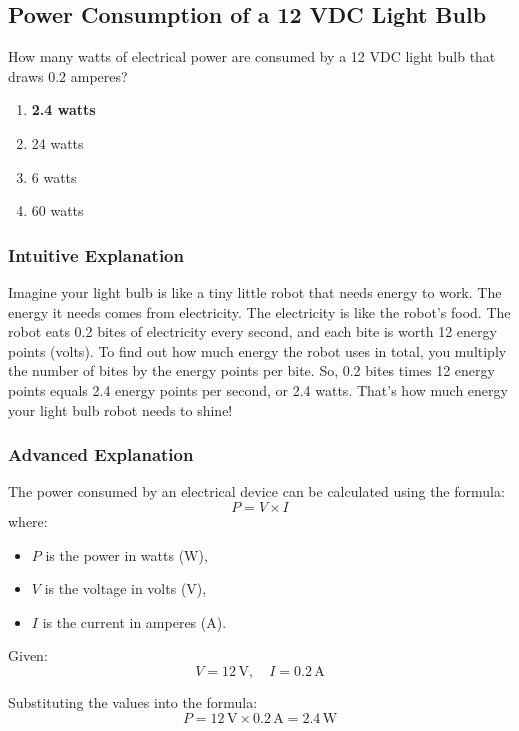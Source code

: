 \subsection{Power Consumption of a 12 VDC Light Bulb}
\label{G5B04}

\begin{tcolorbox}[colback=gray!10!white,colframe=black!75!black,title=G5B04]
How many watts of electrical power are consumed by a 12 VDC light bulb that draws 0.2 amperes?
\begin{enumerate}[label=\Alph*,noitemsep]
    \item \textbf{2.4 watts}
    \item 24 watts
    \item 6 watts
    \item 60 watts
\end{enumerate}
\end{tcolorbox}

\subsubsection{Intuitive Explanation}
Imagine your light bulb is like a tiny little robot that needs energy to work. The energy it needs comes from electricity. The electricity is like the robot's food. The robot eats 0.2 bites of electricity every second, and each bite is worth 12 energy points (volts). To find out how much energy the robot uses in total, you multiply the number of bites by the energy points per bite. So, 0.2 bites times 12 energy points equals 2.4 energy points per second, or 2.4 watts. That's how much energy your light bulb robot needs to shine!

\subsubsection{Advanced Explanation}
The power consumed by an electrical device can be calculated using the formula:
\[
P = V \times I
\]
where:
\begin{itemize}
    \item \( P \) is the power in watts (W),
    \item \( V \) is the voltage in volts (V),
    \item \( I \) is the current in amperes (A).
\end{itemize}

Given:
\[
V = 12 \, \text{V}, \quad I = 0.2 \, \text{A}
\]

Substituting the values into the formula:
\[
P = 12 \, \text{V} \times 0.2 \, \text{A} = 2.4 \, \text{W}
\]

